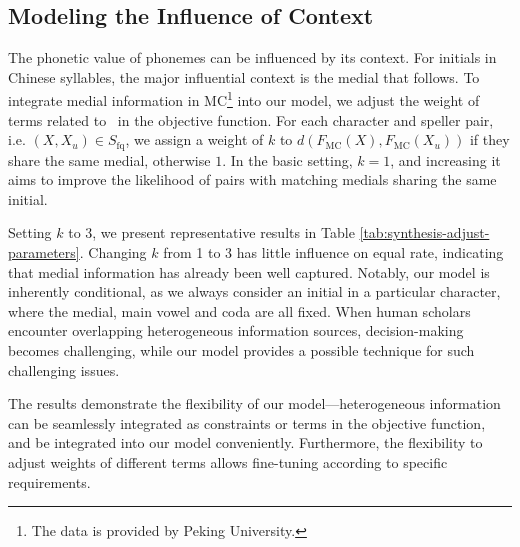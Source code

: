 \subsection{Modeling the Influence of Context} \label{sec:model-context}
The phonetic value of phonemes can be influenced by its context. 
For initials in Chinese syllables, the major influential context is the medial that follows. 
To integrate medial information in MC\footnote{The data is provided by Peking University.}
into our model, we adjust the weight of terms related to \fq~in the objective function. 
For each character and speller pair, i.e. $(X,X_u) \in S_{\text{fq}}$, we assign a weight of $k$ to $d(F_{\text{MC}}(X), F_{\text{MC}}(X_u))$ if they share the same medial, otherwise $1$. In the basic setting, $k=1$, and increasing it aims to improve the likelihood of pairs with matching medials sharing the same initial.

Setting $k$ to 3, we present representative results in Table \ref{tab:synthesis-adjust-parameters}. Changing $k$ from 1 to 3 has little influence on equal rate, indicating that medial information has already been well captured. 
Notably, our model is inherently conditional, 
as we always consider an initial in a particular character, where the medial, main vowel and coda are all fixed. 
When human scholars encounter overlapping heterogeneous information sources, decision-making becomes challenging, while our model provides a possible technique for such challenging issues.

The results demonstrate the flexibility of our model---heterogeneous information can be seamlessly integrated as constraints or terms in the objective function, and be integrated into our model conveniently. Furthermore, the flexibility to adjust weights of different terms allows fine-tuning according to specific requirements.

